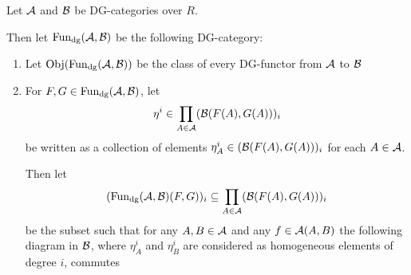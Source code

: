     

\begin{definition}[\( \Fun_{\dg}(\Ac, \Bc) \)]
    \label{def:dg_functor_category}
    Let \( {\mathcal{A}} \) and \( {\mathcal{B}} \) be DG-categories over \( R \).

    Then let \( \Fun_{\dg}(\Ac, \Bc) \) be the following DG-category:
    \begin{enumerate}
        \item{
            Let \( \operatorname{Obj}(\operatorname{Fun}_{\operatorname{dg}}({\mathcal{A}}, {\mathcal{B}})) \) be the class of every DG-functor from \( {\mathcal{A}} \) to \( {\mathcal{B}} \)
        }
        \item{
            For \( F, G \in \operatorname{Fun}_{\operatorname{dg}}({\mathcal{A}}, {\mathcal{B}}) \), let
            \[
                \eta^i \in \prod_{A \in {\mathcal{A}}} ({\mathcal{B}}(F(A), G(A)))_i
            \]
            be written as a collection of elements \( \eta_A^i \in ({\mathcal{B}}(F(A), G(A)))_i \) for each \( A \in {\mathcal{A}} \).
            
            Then let
            \[
                (\operatorname{Fun}_{\operatorname{dg}}({\mathcal{A}}, {\mathcal{B}})(F, G))_i
                \subseteq \prod_{A \in {\mathcal{A}}} ({\mathcal{B}}(F(A), G(A)))_i
            \]
            be the subset such that for any \( A, B \in {\mathcal{A}} \) and any \( f \in {\mathcal{A}}(A, B) \) the following diagram in \( {\mathcal{B}} \), where \( \eta_A^i \) and \( \eta_B^i \) are considered as homogeneous elements of degree \( i \), commutes
            \begin{center}
\end{center}}
\end{enumerate}
\end{definition}
